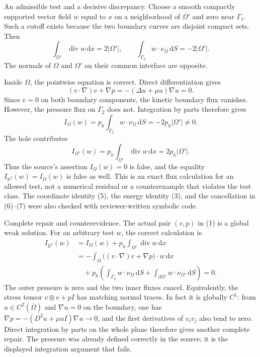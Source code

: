 \documentclass[10pt]{article}
\begin{document}
An admissible test and a decisive discrepancy. Choose a smooth compactly supported vector field \(w\) equal to \(x\) on a neighborhood of \(\overline{\Omega'}\) and zero near \(\Gamma_1\). Such a cutoff exists because the two boundary curves are disjoint compact sets. Then \[\int_{\Omega'}\operatorname{div}w\,\mathrm dx=2|\Omega'|,
 \qquad
 \int_{\Gamma_2}w\cdot\nu_\Omega\,\mathrm dS=-2|\Omega'|.
 \tag{4}\] The normals of \(\Omega\) and \(\Omega'\) on their common interface are opposite.\par
Inside \(\Omega\), the pointwise equation is correct. Direct differentiation gives \[(v\cdot\nabla)v+\nabla p
 =-(\Delta u+\mu u)\nabla u=0.
 \tag{5}\] Since \(v=0\) on both boundary components, the kinetic boundary flux vanishes. However, the pressure flux on \(\Gamma_2\) does not. Integration by parts therefore gives \[I_\Omega(w)=p_h\int_{\Gamma_2}w\cdot\nu_\Omega\,\mathrm dS
          =-2p_h|\Omega'|\ne0.
 \tag{6}\] The hole contributes \[I_{\Omega'}(w)=p_h\int_{\Omega'}\operatorname{div}w\,\mathrm dx
           =2p_h|\Omega'|.
 \tag{7}\] Thus the source’s assertion \(I_\Omega(w)=0\) is false, and the equality \(I_{\mathbb R^2}(w)=I_\Omega(w)\) is false as well. This is an exact flux calculation for an allowed test, not a numerical residual or a counterexample that violates the test class. The coordinate identity (5), the energy identity (3), and the cancellation in (6)–(7) were also checked with reviewer-written symbolic code.\par
Complete repair and counterevidence. The actual pair \((v,p)\) in (1) is a global weak solution. For an arbitrary test \(w\), the correct calculation is \[\begin{aligned}
 I_{\mathbb R^2}(w)
 &=I_\Omega(w)+p_h\int_{\Omega'}\operatorname{div}w\,\mathrm dx\\
 &=-\int_\Omega\bigl((v\cdot\nabla)v+\nabla p\bigr)\cdot w\,\mathrm dx\\
 &\quad+p_h\left(
   \int_{\Gamma_2}w\cdot\nu_\Omega\,\mathrm dS+
   \int_{\partial\Omega'}w\cdot\nu_{\Omega'}\,\mathrm dS\right)=0.
 \end{aligned}
 \tag{8}\] The outer pressure is zero and the two inner fluxes cancel. Equivalently, the stress tensor \(v\otimes v+pI\) has matching normal traces. In fact it is globally \(C^1\): from \(u\in C^2(\overline\Omega)\) and \(\nabla u=0\) on the boundary, one has \(\nabla p=-(D^2u+\mu uI)\nabla u\to0\), and the first derivatives of \(v_iv_j\) also tend to zero. Direct integration by parts on the whole plane therefore gives another complete repair. The pressure was already defined correctly in the source; it is the displayed integration argument that fails.\par
\end{document}
